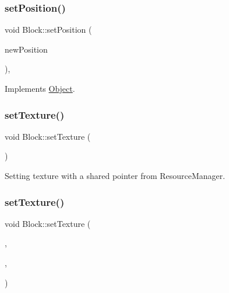 \subsubsection{\texorpdfstring{setPosition()}{setPosition()}}
{\footnotesize\ttfamily void Block\+::set\+Position (\begin{DoxyParamCaption}\item[{const sf\+::\+Vector2f \&}]{new\+Position }\end{DoxyParamCaption})\hspace{0.3cm}{\ttfamily [inline]}, {\ttfamily [virtual]}}



Implements \mbox{\hyperlink{class_object_ac5c796bfa75dedf6d3bfc74685b2b77d}{Object}}.

\mbox{\label{class_block_a01ef735022e9a92357e00cca6228f7b7}} 
\subsubsection{\texorpdfstring{setTexture()}{setTexture()}\hspace{0.1cm}{\footnotesize\ttfamily [1/2]}}
{\footnotesize\ttfamily void Block\+::set\+Texture (\begin{DoxyParamCaption}\item[{const std\+::shared\+\_\+ptr$<$ sf\+::\+Texture $>$}]{ }\end{DoxyParamCaption})}



Setting texture with a shared pointer from Resource\+Manager. 

\mbox{\label{class_block_a866e57c9df2c81910879ef991670931e}} 
\subsubsection{\texorpdfstring{setTexture()}{setTexture()}\hspace{0.1cm}{\footnotesize\ttfamily [2/2]}}
{\footnotesize\ttfamily void Block\+::set\+Texture (\begin{DoxyParamCaption}\item[{\mbox{\hyperlink{class_game_engine}{Game\+Engine}} $\ast$}]{,  }\item[{std\+::string}]{,  }\item[{sf\+::\+Int\+Rect}]{ }\end{DoxyParamCaption})}



